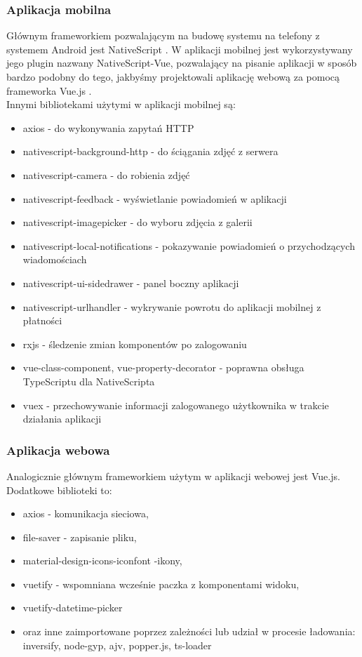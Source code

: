 \documentclass{article}
\begin{document}
\subsubsection{Aplikacja mobilna}
Głównym frameworkiem pozwalającym na budowę systemu na telefony z systemem Android jest NativeScript \cite{ns}. W aplikacji mobilnej jest wykorzystywany jego plugin nazwany NativeScript-Vue, pozwalający na pisanie aplikacji w sposób bardzo podobny do tego, jakbyśmy projektowali aplikację webową za pomocą frameworka Vue.js \cite{vue}.
\\
Innymi bibliotekami użytymi w aplikacji mobilnej są: 
\begin{itemize}
    \item axios - do wykonywania zapytań HTTP \cite{axios}
    \item nativescript-background-http - do ściągania zdjęć z serwera \cite{ns-http}
    \item nativescript-camera - do robienia zdjęć \cite{ns-cam}
    \item nativescript-feedback - wyświetlanie powiadomień w aplikacji \cite{ns-feed}
    \item nativescript-imagepicker - do wyboru zdjęcia z galerii \cite{ns-img}
    \item nativescript-local-notifications - pokazywanie powiadomień o przychodzących wiadomościach \cite{ns-notif}
    \item nativescript-ui-sidedrawer - panel boczny aplikacji \cite{ns-drw}
    \item nativescript-urlhandler - wykrywanie powrotu do aplikacji mobilnej z płatności \cite{ns-uha}
    \item rxjs - śledzenie zmian komponentów po zalogowaniu \cite{rxjs}
    \item vue-class-component, vue-property-decorator - poprawna obsługa TypeScriptu dla NativeScripta \cite{vue-cc} \cite{vue-pd}
    \item vuex - przechowywanie informacji zalogowanego użytkownika w trakcie działania aplikacji \cite{vuex}
\end{itemize}
\subsubsection{Aplikacja webowa}
Analogicznie głównym frameworkiem użytym w aplikacji webowej jest Vue.js.
Dodatkowe biblioteki to:
\begin{itemize}
\item axios - komunikacja sieciowa,
\item file-saver - zapisanie pliku,
\item material-design-icons-iconfont -ikony,
\item vuetify - wspomniana wcześnie paczka z komponentami widoku,
\item vuetify-datetime-picker
\item oraz inne zaimportowane poprzez zależności lub udział w procesie ładowania: inversify, node-gyp, ajv, popper.js, ts-loader
\end{itemize}
\end{document}
